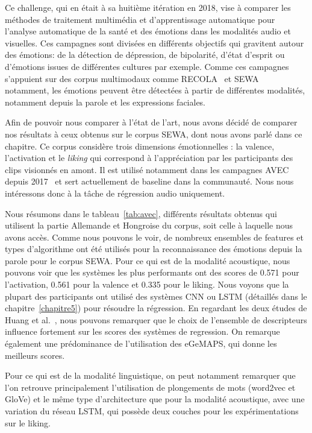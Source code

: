 Ce challenge, qui en était à sa huitième itération en 2018, vise à comparer les méthodes de traitement multimédia et d'apprentissage automatique pour l'analyse automatique de la santé et des émotions dans les modalités audio et visuelles. Ces campagnes sont divisées en différents objectifs qui gravitent autour des émotions: de la détection de dépression, de bipolarité, d'état d'esprit ou d'émotions issues de différentes cultures par exemple. Comme ces campagnes s'appuient sur des corpus multimodaux comme RECOLA~\cite{Ringeval2013} et SEWA~\cite{SEWA} notamment, les émotions peuvent être détectées à partir de différentes modalités, notamment depuis la parole et les expressions faciales.

Afin de pouvoir nous comparer à l'état de l'art, nous avons décidé de comparer nos résultats à ceux obtenus sur le corpus SEWA, dont nous avons parlé dans ce chapitre.
Ce corpus considère trois dimensions émotionnelles : la valence, l'activation et le \textit{liking} qui correspond à l'appréciation par les participants des clips visionnés en amont. Il est utilisé notamment dans les campagnes AVEC depuis 2017~\cite{AVEC2017,AVEC2018,AVEC2019} et sert actuellement de baseline dans la communauté. Nous nous intéressons donc à la tâche de régression audio uniquement.

Nous résumons dans le tableau~\ref{tab:avec}, différents résultats obtenus qui utilisent la partie Allemande et Hongroise du corpus, soit celle à laquelle nous avons accès. Comme nous pouvons le voir, de nombreux ensembles de features et types d'algorithme ont été utilisés pour la reconnaissance des émotions depuis la parole pour le corpus SEWA.
Pour ce qui est de la modalité acoustique, nous pouvons voir que les systèmes les plus performants ont des scores de 0.571 pour l'activation, 0.561 pour la valence et 0.335 pour le liking. Nous voyons que la plupart des participants ont utilisé des systèmes CNN ou LSTM (détaillés dans le chapitre~\ref{chapitre5}) pour résoudre la régression. En regardant les deux études de Huang et al.~\cite{Huang2017,Huang2018}, nous pouvons remarquer que le choix de l'ensemble de descripteurs influence fortement sur les scores des systèmes de regression. On remarque également une prédominance de l'utilisation des eGeMAPS, qui donne les meilleurs scores.

Pour ce qui est de la modalité linguistique, on peut notamment remarquer que l'on retrouve principalement l'utilisation de plongements de mots (word2vec et GloVe) et le même type d'architecture que pour la modalité acoustique, avec une variation du réseau LSTM, qui possède deux couches pour les expérimentations sur le liking.

